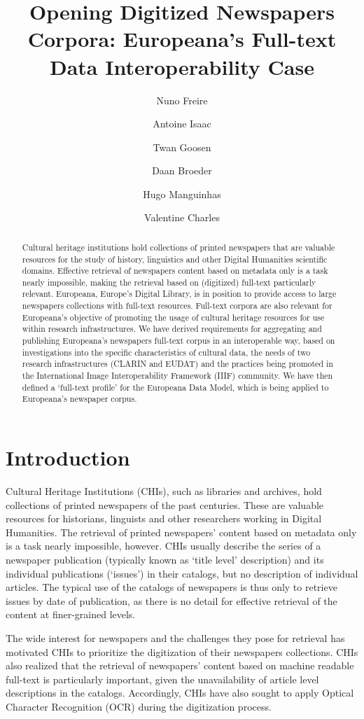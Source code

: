 \documentclass[a4paper,UKenglish,cleveref, autoref]{oasics-v2019}
\title{Opening Digitized Newspapers Corpora: Europeana’s Full-text Data Interoperability Case} %
\author{Nuno Freire}{INESC-ID, Lisbon, Portugal}{nuno.freire@tecnico.ulisboa.pt}{https://orcid.org/0000-0002-3632-8046}{This work was partly supported by Portuguese  national funds through Fundação para a Ciência e a Tecnologia (FCT) with reference UID/CEC/50021/2013, and by the European Commission under contract number 30-CE-0885387/00-80.e.}%
\author{Antoine Isaac}{Europeana Foundation, The Hague, The Netherlands}{antoine.isaac@europeana.eu}{https://orcid.org/0000-0001-9767-6979}{}
\author{Twan Goosen}{CLARIN ERIC, Utrecht, The Netherlands}{twan@clarin.eu}{https://orcid.org/0000-0002-1634-257X}{}
\author{Daan Broeder}{KNAW Humanities Cluster, Amsterdam, The Netherlands}{daan.broeder@di.huc.knaw.nl}{https://orcid.org/0000-0002-8446-3410}{}
\author{Hugo Manguinhas}{Europeana Foundation, The Hague, The Netherlands}{hugo.manguinhas@europeana.eu}{}{}
\author{Valentine Charles}{Europeana Foundation, The Hague, The Netherlands}{valentine.charles@europeana.eu}{https://orcid.org/0000-0003-4085-5778}{}
\begin{document}
\maketitle

\begin{abstract}
Cultural heritage institutions hold collections of printed newspapers that are valuable resources for the study of history, linguistics and other Digital Humanities scientific domains. Effective retrieval of newspapers content based on metadata only is a task nearly impossible, making the retrieval based on (digitized) full-text particularly relevant. Europeana, Europe’s Digital Library, is in position to provide access to large newspapers collections with full-text resources. Full-text corpora are also relevant for Europeana’s objective of promoting the usage of cultural heritage resources for use within research infrastructures. We have derived requirements for aggregating and publishing Europeana’s newspapers full-text corpus in an interoperable way, based on investigations into the specific characteristics of cultural data, the needs of two research infrastructures (CLARIN and EUDAT) and the practices being promoted in the International Image Interoperability Framework (IIIF) community. We have then defined a `full-text profile' for the Europeana Data Model, which is being applied to Europeana’s newspaper corpus.
\end{abstract}

\section{Introduction}
\label{sec:introduction}
Cultural Heritage Institutions (CHIs), such as libraries and archives, hold collections of printed newspapers of the past centuries. These are valuable resources for historians, linguists and other researchers working in Digital Humanities. The retrieval of printed newspapers' content based on metadata only is a task nearly impossible, however. CHIs usually describe the series of a newspaper publication (typically known as `title level' description) and its individual publications (`issues') in their catalogs, but no description of individual articles. The typical use of the catalogs of newspapers is thus only to retrieve issues by date of publication, as there is no detail for effective retrieval of the content at finer-grained levels. 

The wide interest for newspapers and the challenges they pose for retrieval has motivated CHIs to prioritize the digitization of their newspapers collections. CHIs also realized that the retrieval of newspapers' content based on machine readable full-text is particularly important, given the unavailability of article level descriptions in the catalogs. Accordingly, CHIs have also sought to apply Optical Character Recognition (OCR) during the digitization process.  
\end{document}
